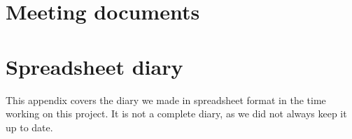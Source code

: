 \section{Meeting documents}
\label{APP-WS-MD}


\section{Spreadsheet diary}
\label{APP-SS}
This appendix covers the diary we made in spreadsheet format in the time working
on this project. It is not a complete diary, as we did not always keep it up to
date. 

